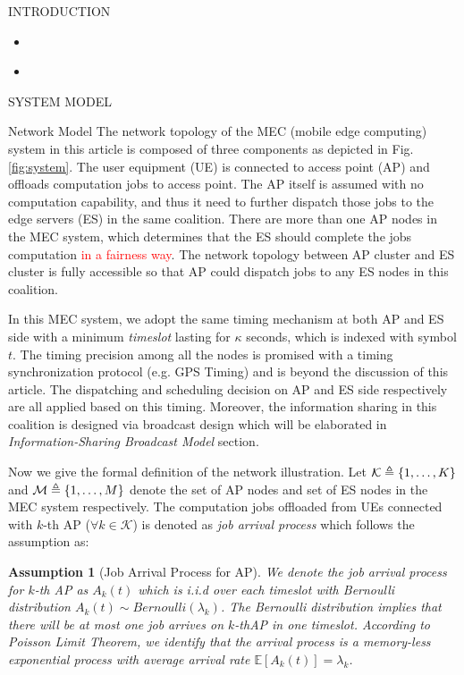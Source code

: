 \documentclass[10pt, conference, letterpaper]{IEEEtran}
\newtheorem{assumption}{Assumption}
\newcommand{\define}{\triangleq}
\DeclarePairedDelimiter{\set}{\{}{\}}
\newcommand{\apSet}{\mathcal{K}}
\begin{document}
\begin{section}{INTRODUCTION}
\begin{itemize}
                
            \item \text{[Survey]}
            
            \item \text{[unfinished]}
                \cite{Chen2018a} 
        \end{itemize}

    \end{section}

    \begin{section}{SYSTEM MODEL}
        \label{sec:model}
        \begin{subsection}{Network Model}
            The network topology of the MEC (mobile edge computing) system in this article is composed of three components as depicted in Fig. \ref{fig:system}.
            The user equipment (UE) is connected to access point (AP) and offloads computation jobs to access point. The AP itself is assumed with no computation capability, and thus it need to further dispatch those jobs to the edge servers (ES) in the same coalition. There are more than one AP nodes in the MEC system, which determines that the ES should complete the jobs computation \textcolor{red}{in a fairness way}. The network topology between AP cluster and ES cluster is fully accessible so that AP could dispatch jobs to any ES nodes in this coalition.

            In this MEC system, we adopt the same timing mechanism at both AP and ES side with a minimum \emph{timeslot} lasting for $\kappa$ seconds, which is indexed with symbol $t$. The timing precision among all the nodes is promised with a timing synchronization protocol (e.g. GPS Timing) and is beyond the discussion of this article. The dispatching and scheduling decision on AP and ES side respectively are all applied based on this timing. Moreover, the information sharing in this coalition is designed via broadcast design which will be elaborated in \emph{Information-Sharing Broadcast Model} section.

            Now we give the formal definition of the network illustration. Let $\apSet \define \set{1,\dots,K}$ and $\mathcal{M} \define \set{1,\dots,M}$ denote the set of AP nodes and set of ES nodes in the MEC system respectively. The computation jobs offloaded from UEs connected with $k$-th AP ($\forall k\in\apSet$) is denoted as \emph{job arrival process} which follows the assumption as:
            \begin{assumption}[Job Arrival Process for AP]
                We denote the job arrival process for $k$-th AP as $A_k(t)$ which is i.i.d over each timeslot with Bernoulli distribution $A_k(t) \sim Bernoulli(\lambda_k)$. The Bernoulli distribution implies that there will be at most one job arrives on $k$-thAP in one timeslot. According to Poisson Limit Theorem, we identify that the arrival process is a memory-less exponential process with average arrival rate $\mathbb{E}[A_k(t)] = \lambda_k$.
            \end{assumption}
            

\end{subsection}
\end{section}
\end{document}
